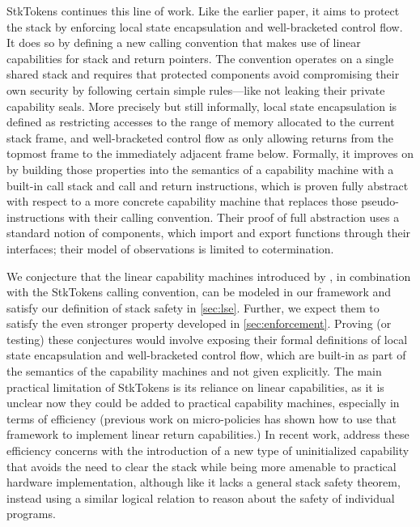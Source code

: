 \documentclass[acmsmall,review,anonymous]{acmart}\settopmatter{printfolios=true,printccs=false,printacmref=false}
\begin{document}
StkTokens \citep{Skorstengaard+19} continues this line of work. Like
the earlier paper, it aims to protect the stack by enforcing local state
encapsulation and well-bracketed control flow. It does so by defining a new
calling convention that makes use of linear capabilities for stack and return
pointers. The convention operates on a single shared stack and requires that
protected components avoid compromising their own security by following certain
simple rules---like not leaking their private capability seals. More
precisely but still informally, local state encapsulation is defined as
restricting accesses to the range of memory allocated to the current stack
frame, and well-bracketed control flow as only allowing returns from the topmost
frame to the immediately adjacent frame below. Formally, it improves on
\citet{Skorstengaard+19b} by building those properties into the semantics of a
capability machine with a built-in call stack and call and return instructions,
which is proven fully abstract with respect to a more concrete capability
machine that replaces those pseudo-instructions with their calling convention.
Their proof of full abstraction uses a standard notion of components, which
import and export functions through their interfaces; their model of
observations is limited to cotermination.

We conjecture that the linear capability machines introduced by
\citep{Skorstengaard+19}, in combination with the StkTokens calling convention,
can be modeled in our framework and satisfy our definition of stack safety in
\cref{sec:lse}. Further, we expect them to satisfy the even stronger
property developed in \cref{sec:enforcement}. Proving (or testing) these conjectures would
involve exposing their formal definitions of local state encapsulation and
well-bracketed control flow, which are built-in as part of the
semantics of the capability machines and not given explicitly.
The main practical limitation of StkTokens
is its reliance on linear capabilities, as it is unclear now they could be added
to practical capability machines, especially in terms of efficiency (previous
work on micro-policies \citep{yannis-report} has shown how to use that framework
to implement linear return capabilities.)
%
In recent work, \citet{Georges+21} address these efficiency concerns
with the introduction of a new type of uninitialized capability that
avoids the need to clear the stack while being more amenable to
practical hardware implementation, although like
\citet{Skorstengaard+19b} it lacks a general stack safety theorem,
instead using a similar logical relation to reason about the safety of
individual programs.
\end{document}
